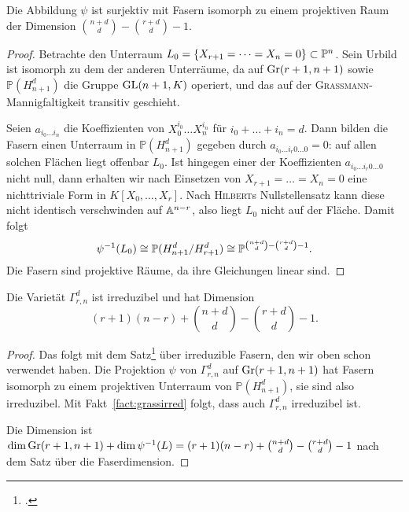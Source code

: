 \begin{prop}
Die Abbildung $\psi$ ist surjektiv mit Fasern isomorph zu einem projektiven Raum der Dimension $\binom{n+d}d - \binom{r+d}d - 1$.
\end{prop}
\begin{proof}
Betrachte den Unterraum $L_0 = \{X_{r+1} = \dots = X_n = 0\} \subset \mathbb P^{n}$. Sein Urbild ist isomorph zu dem der anderen Unterräume, da auf $\grass r+1/{n+1}$ sowie $\mathbb P(H_{n+1}^d)$ die Gruppe $\mathrm{GL}(n+1,K)$ operiert, und das auf der \textsc{Grassmann}-Mannigfaltigkeit transitiv geschieht.

Seien $a_{i_0 \dots i_n}$ die Koeffizienten von $X_0^{i_0} \dots X_n^{i_n}$ für $i_0 + \dots + i_n = d$. Dann bilden die Fasern einen Unterraum in $\mathbb P(H_{n+1}^d)$ gegeben durch $a_{i_0 \dots i_r 0 \dots 0} = 0$: auf allen solchen Flächen liegt offenbar $L_0$. Ist hingegen einer der Koeffizienten $a_{i_0 \dots i_r 0 \dots 0}$ nicht null, dann erhalten wir nach Einsetzen von $X_{r+1} = \dots = X_n = 0$ eine nichttriviale Form in $K[X_0, \dots, X_r]$. Nach \textsc{Hilbert}s Nullstellensatz kann diese nicht identisch verschwinden auf $\mathbb A^{n-r}$, also liegt $L_0$ nicht auf der Fläche. Damit folgt
\begin{equation*}
\psi^{-1}(L_0) \cong \mathbb P(H_{n+1}^d / H_{r+1}^d) \cong \mathbb P^{\binom{n+d}d - \binom{r+d}d - 1}.
\end{equation*}
Die Fasern sind projektive Räume, da ihre Gleichungen linear sind.
\end{proof}

\begin{coroll}
Die Varietät $\Gamma_{r,n}^d$ ist irreduzibel und hat Dimension
\begin{equation}
(r+1)(n-r) + \binom{n+d}d - \binom{r+d}d - 1.
\end{equation}
\end{coroll}
\begin{proof}
Das folgt mit dem Satz\footcite[S.~77, Theorem~8]{Shafarevich} über irreduzible Fasern, den wir oben schon verwendet haben. Die Projektion $\psi$ von $\Gamma_{r,n}^d$ auf $\grass r+1/{n+1}$ hat Fasern isomorph zu einem projektiven Unterraum von $\mathbb P(H_{n+1}^d)$, sie sind also irreduzibel. Mit Fakt~\ref{fact:grassirred} folgt, dass auch $\Gamma_{r,n}^d$ irreduzibel ist.

Die Dimension ist $\dim \grass r+1/{n+1} + \dim \psi^{-1}(L) = (r+1)(n-r) + \binom{n+d}d - \binom{r+d}d - 1$ nach dem Satz über die Faserdimension.
\end{proof}

